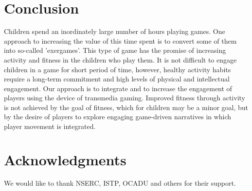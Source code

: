 \documentclass{SIGCHI2015LaTex/sigchi}
\begin{document}
\section{Conclusion}
Children spend an inordinately large number of hours playing games. One approach to increasing the value of this time spent is to convert some of them into so-called 'exergames'. This type of game has the promise of increasing activity and fitness in the children who play them. It is not difficult to engage children in a game for short period of time, however, healthy activity habits require a long-term commitment and high levels of physical and intellectual engagement. Our approach is to integrate and to increase the engagement of players using the device of transmedia gaming. Improved fitness through activity is not achieved by the goal of fitness, which for children may be a minor goal, but by the desire of players to explore engaging game-driven narratives in which player movement is integrated. 

\section{Acknowledgments}

We would like to thank NSERC, ISTP, OCADU and others for their support.

%
%
%
%
%
\balance




\end{document}

